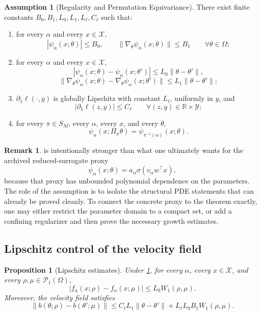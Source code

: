 \documentclass[11pt]{article}
\newtheorem{proposition}[theorem]{Proposition}
\theoremstyle{definition}
\newtheorem{remark}[theorem]{Remark}
\newtheorem{assumption}[theorem]{Assumption}
\newcommand{\R}{\mathbb{R}}
\newcommand{\PP}{\mathcal{P}}
\newcommand{\W}{W_1}
\begin{document}
\begin{assumption}[Regularity and Permutation Equivariance]
\label{ass:regularity}
There exist finite constants $B_0,B_1,L_0,L_1,L_\ell,C_\ell$ such that:
\begin{enumerate}[label=(\roman*),leftmargin=2em]
  \item for every $\alpha$ and every $x \in \mathcal{X}$,
  \[
    |\psi_\alpha(x;\theta)| \le B_0,
    \qquad
    \|\nabla_\theta \psi_\alpha(x;\theta)\| \le B_1
    \qquad
    \forall \theta \in \Omega;
  \]
  \item for every $\alpha$ and every $x \in \mathcal{X}$,
  \[
    |\psi_\alpha(x;\theta)-\psi_\alpha(x;\theta')| \le L_0 \|\theta-\theta'\|,
  \]
  \[
    \|\nabla_\theta \psi_\alpha(x;\theta)-\nabla_\theta \psi_\alpha(x;\theta')\|
    \le L_1 \|\theta-\theta'\|;
  \]
  \item $\partial_1 \ell(\cdot,y)$ is globally Lipschitz with constant $L_\ell$, uniformly in $y$, and
  \[
    |\partial_1 \ell(z,y)| \le C_\ell
    \qquad
    \forall (z,y)\in \R \times \mathcal{Y};
  \]
  \item for every $\pi \in S_M$, every $\alpha$, every $x$, and every $\theta$,
  \begin{equation}
    \psi_\alpha(x;\Pi_\pi \theta)=\psi_{\pi^{-1}(\alpha)}(x;\theta).
    \label{eq:psi-equiv}
  \end{equation}
\end{enumerate}
\end{assumption}

\begin{remark}
 is intentionally stronger than what one ultimately wants for the archived reduced-surrogate proxy
\[
  \psi_\alpha(x;\theta)=a_\alpha \sigma(v_\alpha w^\top x),
\]
because that proxy has unbounded polynomial dependence on the parameters.
The role of the assumption is to isolate the structural PDE statements that can already be proved cleanly.
To connect the concrete proxy to the theorem exactly, one may either restrict the parameter domain to a compact set, or add a confining regularizer and then prove the necessary growth estimates.
\end{remark}

\subsection{Lipschitz control of the velocity field}

\begin{proposition}[Lipschitz estimates]
\label{prop:lipschitz}
Under \cref{ass:regularity}, for every $\alpha$, every $x \in \mathcal{X}$, and every $\rho,\mu \in \PP_1(\Omega)$,
\[
  |f_\alpha(x;\rho)-f_\alpha(x;\mu)| \le L_0 \W(\rho,\mu).
\]
Moreover, the velocity field satisfies
\[
  \|b(\theta;\rho)-b(\theta';\mu)\|
  \le
  C_\ell L_1 \|\theta-\theta'\|
  +
  L_\ell L_0 B_1 \W(\rho,\mu).
\]
\end{proposition}
\end{document}
